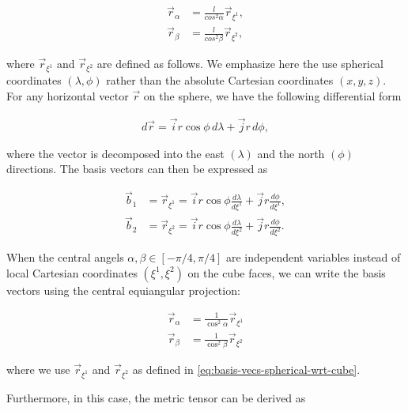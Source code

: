\documentclass{report}
\begin{document}
\begin{subequations}
    \begin{align}
        \vec{r}_{\alpha} &= \frac{l}{cos^2 \alpha} \vec{r}_{\xi^1} ,\\
        \vec{r}_{\beta} &= \frac{l}{cos^2 \beta} \vec{r}_{\xi^2},
    \end{align}
\end{subequations}

\noindent where $ \vec{r}_{\xi^1}$ and $ \vec{r}_{\xi^2}$ are defined as follows. We emphasize here the use spherical coordinates $(\lambda, \phi)$ rather than the absolute Cartesian coordinates $(x,y,z)$. For any horizontal vector $\vec r$ on the sphere, we have the following differential form

\begin{align}
    d \vec{r} = \vec{i} r \cos \phi \, d \lambda + \vec{j} r \, d \phi,
\end{align}

\noindent where the vector is decomposed into the east $(\lambda)$ and the north $(\phi)$ directions. The basis vectors can then be expressed as

\begin{subequations}\label{eq:basis-vecs-spherical-wrt-cube}
    \begin{align}
        \vec{b}_{1} &= \vec{r}_{\xi^1} = \vec{i} r \cos \phi \frac{d\lambda}{d \xi^1} + \vec{j} r \frac{d \phi}{d \xi^1},\\
        \vec{b}_{2} &= \vec{r}_{\xi^2} = \vec{i} r \cos \phi \frac{d\lambda}{d \xi^2} + \vec{j} r \frac{d \phi}{d \xi^2} .
    \end{align}
\end{subequations}

When the central angels $\alpha, \beta \in [- \pi / 4, \pi / 4]$ are independent variables instead of local Cartesian coordinates $(\xi^1, \xi^2)$ on the cube faces, we can write the basis vectors using the central equiangular projection:

\begin{align}
    \vec{r}_{\alpha} &= \frac{1}{\cos^2 \alpha} \vec{r}_{\xi^1} \\
    \vec{r}_{\beta}  &= \frac{1}{\cos^2  \beta} \vec{r}_{\xi^2}
\end{align}

\noindent where we use $\vec{r}_{\xi^1}$ and $\vec{r}_{\xi^2}$ as defined in \eqref{eq:basis-vecs-spherical-wrt-cube}.

Furthermore, in this case, the metric tensor can be derived as 
\end{document}
